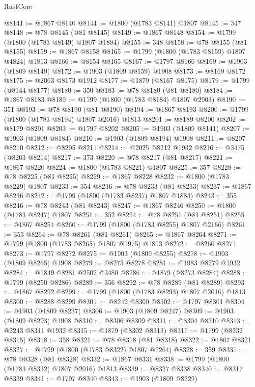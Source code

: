 \begin{lexlean}{RustCore}
\begin{coremodule}
@8141 := @1867 @8140
@8144 := @1800 (@1783 @8141) @1807
@8145 := 347
@8148 := @78 @8145 (@81 @8145)
@8149 := @1867 @8148
@8154 := @1799 (@1800 (@1783 @8149) @1807 @1884)
@8155 := 348
@8158 := @78 @8155 (@81 @8155)
@8159 := @1867 @8158
@8165 := @1799 (@1800 (@1783 @8159) @1807 @4824) @1813
@8166 := @8154 @8165
@8167 := @1797 @8166
@8169 := @1903 (@1809 @8149)
@8172 := @1903 (@1809 @8159) @1908
@8173 := @8169 @8172
@8175 := @2063 @8173 @1912
@8177 := @1879 (@8167 @8175)
@8179 := @1799 (@8144 @8177)
@8180 := 350
@8183 := @78 @8180 (@81 @8180)
@8184 := @1867 @8183
@8189 := @1799 (@1800 (@1783 @8184) @1807 @2903)
@8190 := 351
@8193 := @78 @8190 (@81 @8190)
@8194 := @1867 @8193
@8200 := @1799 (@1800 (@1783 @8194) @1807 @2016) @1813
@8201 := @8189 @8200
@8202 := @8179 @8201
@8203 := @1797 @8202
@8205 := @1903 (@1809 @8141)
@8207 := @1903 (@1809 @8184)
@8210 := @1903 (@1809 @8194) @1908
@8211 := @8207 @8210
@8212 := @8205 @8211
@8214 := @2025 @8212 @1932
@8216 := @3475 (@8203 @8214)
@8217 := 373
@8220 := @78 @8217 (@81 @8217)
@8221 := @1867 @8220
@8224 := @1800 (@1783 @8221) @1807
@8225 := 357
@8228 := @78 @8225 (@81 @8225)
@8229 := @1867 @8228
@8232 := @1800 (@1783 @8229) @1807
@8233 := 354
@8236 := @78 @8233 (@81 @8233)
@8237 := @1867 @8236
@8242 := @1799 (@1800 (@1783 @8237) @1807 @1884)
@8243 := 355
@8246 := @78 @8243 (@81 @8243)
@8247 := @1867 @8246
@8250 := @1800 (@1783 @8247) @1807
@8251 := 352
@8254 := @78 @8251 (@81 @8251)
@8255 := @1867 @8254
@8260 := @1799 (@1800 (@1783 @8255) @1807 @2166)
@8261 := 353
@8264 := @78 @8261 (@81 @8261)
@8265 := @1867 @8264
@8271 := @1799 (@1800 (@1783 @8265) @1807 @1975) @1813
@8272 := @8260 @8271
@8273 := @1797 @8272
@8275 := @1903 (@1809 @8255)
@8278 := @1903 (@1809 @8265) @1908
@8279 := @8275 @8278
@8281 := @1983 @8279 @1932
@8284 := @1849 @8281 @2502 @3480
@8286 := @1879 (@8273 @8284)
@8288 := @1799 (@8250 @8286)
@8289 := 356
@8292 := @78 @8289 (@81 @8289)
@8293 := @1867 @8292
@8299 := @1799 (@1800 (@1783 @8293) @1807 @2016) @1813
@8300 := @8288 @8299
@8301 := @8242 @8300
@8302 := @1797 @8301
@8304 := @1903 (@1809 @8237)
@8306 := @1903 (@1809 @8247)
@8309 := @1903 (@1809 @8293) @1908
@8310 := @8306 @8309
@8311 := @8304 @8310
@8313 := @2243 @8311 @1932
@8315 := @1879 (@8302 @8313)
@8317 := @1799 (@8232 @8315)
@8318 := 358
@8321 := @78 @8318 (@81 @8318)
@8322 := @1867 @8321
@8327 := @1799 (@1800 (@1783 @8322) @1807 @2264)
@8328 := 359
@8331 := @78 @8328 (@81 @8328)
@8332 := @1867 @8331
@8338 := @1799 (@1800 (@1783 @8332) @1807 @2016) @1813
@8339 := @8327 @8338
@8340 := @8317 @8339
@8341 := @1797 @8340
@8343 := @1903 (@1809 @8229)

\end{coremodule}
\end{lexlean}
